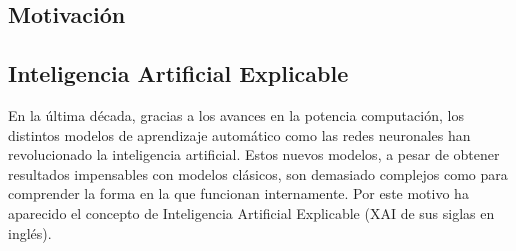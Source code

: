 
\begin{table}[H]
	\caption{Algunos ejemplos de las características consideradas por Todd.}\label{table:caracteristicas_todd}
\end{table}

\subsection{Motivación}

\subsection{Inteligencia Artificial Explicable}

En la última década, gracias a los avances en la potencia computación, los distintos modelos de aprendizaje automático como las redes neuronales han revolucionado la inteligencia artificial. Estos nuevos modelos, a pesar de obtener resultados impensables con modelos clásicos, son demasiado complejos como para comprender la forma en la que funcionan internamente. Por este motivo ha aparecido el concepto de Inteligencia Artificial Explicable \cite{XAI} (XAI de sus siglas en inglés).

